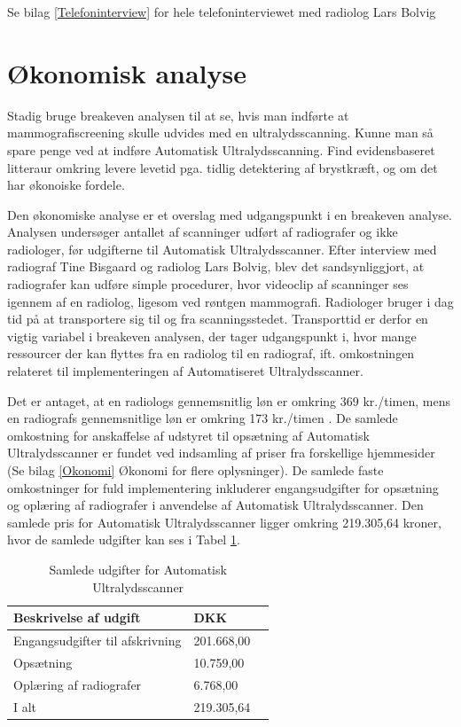 Se bilag \ref{Telefoninterview} for hele telefoninterviewet med radiolog Lars Bolvig

\section{Økonomisk analyse}

Stadig bruge breakeven analysen til at se, hvis man indførte at mammografiscreening skulle udvides med en ultralydsscanning. Kunne man så spare penge ved at indføre Automatisk Ultralydsscanning. 
Find evidensbaseret litteraur omkring levere levetid pga. tidlig detektering af brystkræft, og om det har økonoiske fordele. 



Den økonomiske analyse er et overslag med udgangspunkt i en breakeven analyse. Analysen undersøger antallet af scanninger udført af radiografer og ikke radiologer, før udgifterne til Automatisk Ultralydsscanner. Efter interview med radiograf Tine Bisgaard og radiolog Lars Bolvig, blev det sandsynliggjort, at radiografer kan udføre simple procedurer, hvor videoclip af scanninger ses igennem af en radiolog, ligesom ved røntgen mammografi. Radiologer bruger i dag tid på at transportere sig til og fra scanningsstedet. Transporttid er derfor en vigtig variabel i breakeven analysen, der tager udgangspunkt i, hvor mange ressourcer der kan flyttes fra en radiolog til en radiograf, ift. omkostningen relateret til implementeringen af Automatiseret Ultralydsscanner. 

Det er antaget, at en radiologs gennemsnitlig løn er omkring 369 kr./timen, mens en radiografs gennemsnitlige løn er omkring 173 kr./timen \cite{Lon}. De samlede omkostning for anskaffelse af udstyret til opsætning af Automatisk Ultralydsscanner er fundet ved indsamling af priser fra forskellige hjemmesider (Se bilag \ref{Okonomi} Økonomi for flere oplysninger). De samlede faste omkostninger for fuld implementering inkluderer engangsudgifter for opsætning og oplæring af radiografer i anvendelse af Automatisk Ultralydsscanner. Den samlede pris for Automatisk Ultralydsscanner ligger omkring 219.305,64 kroner, hvor de samlede udgifter kan ses i Tabel \ref{FasteOmkostninger}. 

\begin{table}[htb]
\centering
\begin{tabular}{ | l | l | p{} | }
\hline
\textbf{Beskrivelse af udgift} & \textbf{DKK} \\\hline
Engangsudgifter til afskrivning & 201.668,00 \\\hline
Opsætning & 10.759,00 \\\hline
Oplæring af radiografer & 6.768,00 \\\hline
I alt & 219.305,64 \\\hline
\end{tabular}
\caption{Samlede udgifter for Automatisk Ultralydsscanner}
\label{FasteOmkostninger}
\end{table}


